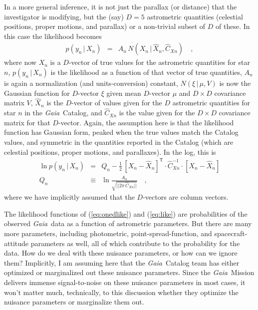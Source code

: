 \documentclass[12pt, modern]{aastex62}
\newcommand{\Gaia}{\textsl{Gaia}}
\newcommand{\given}{\,|\,}
\newcommand{\T}{^{\mathsf{T}}}
\newcommand{\inv}{^{-1}}
\begin{document}
In a more general inference, it is not just the parallax (or distance)
that the investigator is modifying, but the (say) $D=5$ astrometric quantities
(celestial positions, proper motions, and parallax)
or a non-trivial subset of $D$ of these.
In this case the likelihood becomes
\begin{eqnarray}
p(y_n\given X_n) &=& A_n\,N(X_n\given\hat{X}_n,\hat{C}_{Xn})
\label{eq:like}
\quad ,
\end{eqnarray}
where now
$X_n$ is a $D$-vector of true values for the astrometric quantities for star $n$,
$p(y_n\given X_n)$ is the likelihood as a function of that vector of true quantities,
$A_n$ is again a normalization (and units-conversion) constant,
$N(\xi\given\mu,V)$ is now the Gaussian function for $D$-vector $\xi$ given mean $D$-vector $\mu$ and $D\times D$ covariance matrix $V$,
$\hat{X}_n$ is the $D$-vector of values given for the $D$ astrometric quantities for star $n$ in the \Gaia\ Catalog,
and $\hat{C}_{Xn}$ is the value given for the $D\times D$ covariance matrix for that
$D$-vector.
Again, the assumption here is that the likelihood function has Gaussian form, peaked
when the true values match the Catalog values, and symmetric in the quantities
reported in the Catalog (which are celestial positions, proper motions, and parallaxes).
In the log, this is
\begin{eqnarray}
\ln p(y_n\given X_n) &=& Q_n - \frac{1}{2}\,[X_n - \hat{X}_n]\T\cdot\hat{C}_{Xn}\inv\cdot [X_n - \hat{X}_n]
\\
Q_n &\equiv& \ln\frac{A_n}{\sqrt{||2\pi\,\hat{C}_{Xn}||}}
\quad ,
\end{eqnarray}
where we have implicitly assumed that the $D$-vectors are column vectors.

The likelihood functions of (\ref{eq:onedlike}) and (\ref{eq:like}) are
probabilities of the observed \Gaia\ data as a
function of astrometric parameters.
But there are many more parameters, including photometric, point-spread-function,
and spacecraft-attitude parameters as well, all of which contribute to the probability
for the data.
How do we deal with these nuisance parameters, or how can we ignore them?
Implicitly, I am assuming here that the \Gaia\ Catalog team has either optimized
or marginalized out these nuisance parameters.
Since the \Gaia\ Mission delivers immense signal-to-noise on these nuisance
parameters in most cases, it won't matter much, technically, to this
discussion whether they optimize
the nuisance parameters or marginalize them out.
\end{document}
